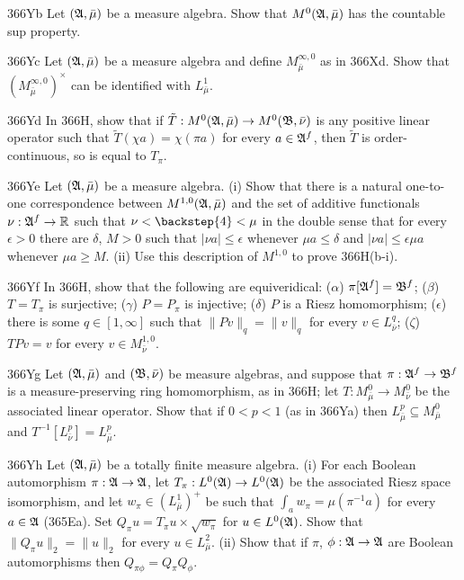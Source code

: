 {\spheader 366Yb Let $(\frak A,\bar\mu)$ be a measure algebra.   Show
that $M^0(\frak A,\bar\mu)$ has the countable sup property.

\spheader 366Yc Let $(\frak A,\bar\mu)$ be a measure algebra and define
$M^{\infty,0}_{\bar\mu}$ as in 366Xd.   Show that
$(M^{\infty,0}_{\bar\mu})^{\times}$ can be identified with
$L^1_{\bar\mu}$.

\spheader 366Yd In 366H, show that if $\tilde T:M^0(\frak A,\bar\mu)\to
M^0(\frak B,\bar\nu)$ is any positive linear operator such that
$\tilde T(\chi a)=\chi(\pi a)$ for every $a\in\frak A^f$, then
$\tilde T$ is order-continuous, so is equal to $T_{\pi}$.

\spheader 366Ye Let $(\frak A,\bar\mu)$ be a measure algebra.   (i)
Show that there is a natural one-to-one correspondence between
$M^{1,0}(\frak A,\bar\mu)$ and the set of additive functionals
$\nu:\frak A^f\to\Bbb R$ such that $\nu<\backstep{4}<\mu$
in the double sense that
for every $\epsilon>0$ there are $\delta$, $M>0$ such that $|\nu
a|\le\epsilon$ whenever $\mu a\le\delta$ and $|\nu a|\le\epsilon\mu a$
whenever $\mu a\ge M$.   (ii) Use this description of $M^{1,0}$ to prove
366H(b-i).

\spheader 366Yf In 366H, show that the following are equiveridical:
($\alpha$) $\pi[\frak A^f]=\frak B^f$;  ($\beta$) $T=T_{\pi}$ is
surjective;  ($\gamma$) $P=P_{\pi}$ is injective;  ($\delta$) $P$ is
a Riesz homomorphism;  ($\epsilon$) there is some $q\in[1,\infty]$ such
that $\|Pv\|_q=\|v\|_q$ for every $v\in L^q_{\bar\nu}$;  ($\zeta$)
$TPv=v$ for every $v\in M^{1,0}_{\bar\nu}$.

\spheader 366Yg Let $(\frak A,\bar\mu)$ and $(\frak B,\bar\nu)$ be
measure algebras, and suppose that $\pi:\frak A^f\to\frak B^f$ is a
measure-preserving ring homomorphism, as in 366H;  let
$T:M^0_{\bar\mu}\to M^0_{\bar\nu}$ be the associated
linear operator.   Show that if $0<p<1$ (as in 366Ya) then
$L^p_{\bar\mu}\subseteq M^0_{\bar\mu}$ and
$T^{-1}[L^p_{\bar\nu}]=L^p_{\bar\mu}$.

\spheader 366Yh Let $(\frak A,\bar\mu)$ be a totally finite measure
algebra.   (i) For each Boolean automorphism $\pi:\frak A\to\frak A$,
let $T_{\pi}:L^0(\frak A)\to L^0(\frak A)$ be the associated Riesz space
isomorphism, and let $w_{\pi}\in(L^1_{\bar\mu})^+$ be such that
$\int_aw_{\pi}=\mu(\pi^{-1}a)$ for every $a\in\frak A$ (365Ea).   Set
$Q_{\pi}u=T_{\pi}u\times\sqrt{w_{\pi}}$ for $u\in L^0(\frak A)$.   Show
that $\|Q_{\pi}u\|_2=\|u\|_2$ for every $u\in L^2_{\bar\mu}$.   (ii)
Show that if $\pi$, $\phi:\frak A\to\frak A$ are Boolean automorphisms
then $Q_{\pi\phi}=Q_{\pi}Q_{\phi}$.

}
